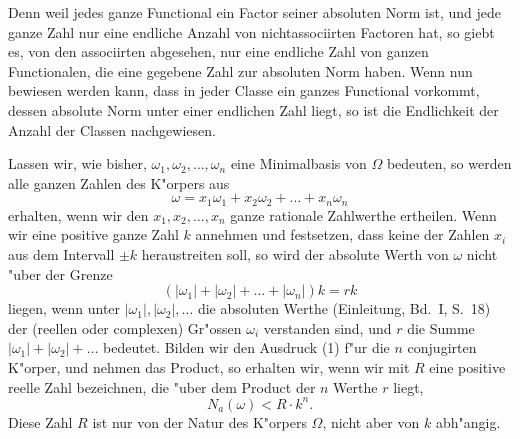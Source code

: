 \documentclass[12pt,a4paper]{article}
\theoremstyle{definition}
\begin{document}
Denn weil jedes ganze Functional ein Factor seiner absoluten Norm ist, und jede ganze Zahl nur eine endliche Anzahl von nichtassociirten Factoren hat, so giebt es, von den associirten abgesehen, nur eine endliche Zahl von ganzen Functionalen, die eine gegebene Zahl zur absoluten Norm haben. Wenn nun bewiesen werden kann, dass in jeder Classe ein ganzes Functional vorkommt, dessen absolute Norm unter einer endlichen Zahl liegt, so ist die Endlichkeit der Anzahl der Classen nachgewiesen.

Lassen wir, wie bisher, $\omega_1, \omega_2, \dots, \omega_n$ eine Minimalbasis von $\Omega$ bedeuten, so werden alle ganzen Zahlen des K"orpers aus
\begin{equation}
\omega = x_1\omega_1 + x_2\omega_2 + \dots + x_n\omega_n
\end{equation}
erhalten, wenn wir den $x_1, x_2, \dots, x_n$ ganze rationale Zahlwerthe ertheilen. Wenn wir eine positive ganze Zahl $k$ annehmen und festsetzen, dass keine der Zahlen $x_i$ aus dem Intervall $\pm k$ heraustreiten soll, so wird der absolute Werth von $\omega$ nicht "uber der Grenze
\begin{equation}
(|\omega_1| + |\omega_2| + \dots + |\omega_n|)k = rk
\end{equation}
liegen, wenn unter $|\omega_1|, |\omega_2|, \dots$ die absoluten Werthe (Einleitung, Bd.~I, S.~18) der (reellen oder complexen) Gr"ossen $\omega_i$ verstanden sind, und $r$ die Summe $|\omega_1| + |\omega_2| + \dots$ bedeutet. Bilden wir den Ausdruck (1) f"ur die $n$ conjugirten K"orper, und nehmen das Product, so erhalten wir, wenn wir mit $R$ eine positive reelle Zahl bezeichnen, die "uber dem Product der $n$ Werthe $r$ liegt,
\begin{equation}
N_a(\omega) < R \cdot k^n.
\end{equation}
Diese Zahl $R$ ist nur von der Natur des K"orpers $\Omega$, nicht aber von $k$ abh"angig.
\end{document}
